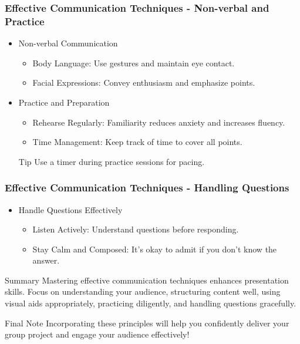 \documentclass{beamer}
\begin{document}
\begin{frame}[fragile]
    \frametitle{Effective Communication Techniques - Non-verbal and Practice}
    
    \begin{itemize}
        \item Non-verbal Communication
        \begin{itemize}
            \item Body Language: Use gestures and maintain eye contact.
            \item Facial Expressions: Convey enthusiasm and emphasize points.
        \end{itemize}
        
        \item Practice and Preparation
        \begin{itemize}
            \item Rehearse Regularly: Familiarity reduces anxiety and increases fluency.
            \item Time Management: Keep track of time to cover all points.
        \end{itemize}
        
        \begin{block}{Tip}
            Use a timer during practice sessions for pacing.
        \end{block}
    \end{itemize}
\end{frame}

\begin{frame}[fragile]
    \frametitle{Effective Communication Techniques - Handling Questions}
    
    \begin{itemize}
        \item Handle Questions Effectively
        \begin{itemize}
            \item Listen Actively: Understand questions before responding.
            \item Stay Calm and Composed: It's okay to admit if you don’t know the answer.
        \end{itemize}
    \end{itemize}
    
    \begin{block}{Summary}
        Mastering effective communication techniques enhances presentation skills. Focus on understanding your audience, structuring content well, using visual aids appropriately, practicing diligently, and handling questions gracefully.
    \end{block}
    
    \begin{block}{Final Note}
        Incorporating these principles will help you confidently deliver your group project and engage your audience effectively!
    \end{block}
\end{frame}
\end{document}
